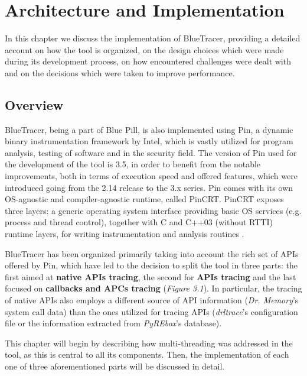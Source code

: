 
\chapter{Architecture and Implementation}
In this chapter we discuss the implementation of BlueTracer, providing a detailed account on how the tool is organized, on the design choices which were made during its development process, on how encountered challenges were dealt with and on the decisions which were taken to improve performance.

\section{Overview}

BlueTracer, being a part of Blue Pill, is also implemented using Pin, a dynamic binary instrumentation framework by Intel, which is vastly utilized for program analysis, testing of software and in the security field. The version of Pin used for the development of the tool is 3.5, in order to benefit from the notable improvements, both in terms of execution speed and offered features, which were introduced going from the 2.14 release to the 3.x series. Pin comes with its own OS-agnostic and compiler-agnostic runtime, called PinCRT. PinCRT exposes three layers: a generic operating system interface providing basic OS services (e.g. process and thread control), together with C and C++03 (without RTTI) runtime layers, for writing instrumentation and analysis routines \cite{Pin}.   

BlueTracer has been organized primarily taking into account the rich set of APIs offered by Pin, which have led to the decision to split the tool in three parts: the first aimed at \textbf{native APIs tracing}, the second for \textbf{APIs tracing} and the last focused on \textbf{callbacks and APCs tracing} (\textit{Figure 3.1}). In particular, the tracing of native APIs also employs a different source of API information (\textit{Dr. Memory}'s system call data) than the ones utilized for tracing APIs (\textit{drltrace}'s configuration file or the information extracted from \textit{PyREbox}'s database).

This chapter will begin by describing how multi-threading was addressed in the tool, as this is central to all its components. Then, the implementation of each one of three aforementioned parts will be discussed in detail. 

